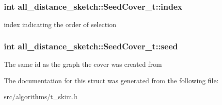 \subsubsection[{index}]{\setlength{\rightskip}{0pt plus 5cm}int all\+\_\+distance\+\_\+sketch\+::\+Seed\+Cover\+\_\+t\+::index}\label{structall__distance__sketch_1_1SeedCover__t_ac11aa27c1be296bb17310c16790f88f5}
index indicating the order of selection \hypertarget{structall__distance__sketch_1_1SeedCover__t_af8100e6ff9b3830e0b40e395cbaeff4b}{}
\subsubsection[{seed}]{\setlength{\rightskip}{0pt plus 5cm}int all\+\_\+distance\+\_\+sketch\+::\+Seed\+Cover\+\_\+t\+::seed}\label{structall__distance__sketch_1_1SeedCover__t_af8100e6ff9b3830e0b40e395cbaeff4b}
The same id as the graph the cover was created from 

The documentation for this struct was generated from the following file\+:\begin{DoxyCompactItemize}
\item 
src/algorithms/t\+\_\+skim.\+h\end{DoxyCompactItemize}
